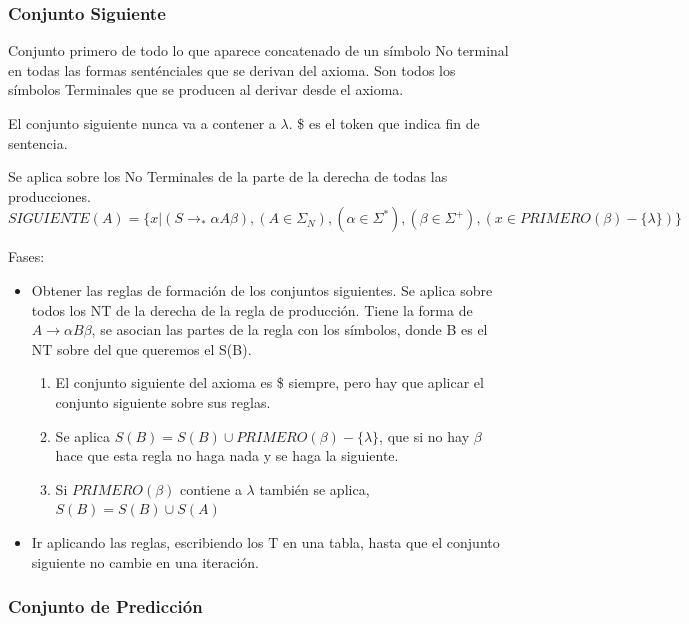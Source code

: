 \documentclass[12pt]{report} %
\begin{document}
\subsubsection{Conjunto Siguiente}

Conjunto primero de todo lo que aparece concatenado de un símbolo No
terminal en todas las formas senténciales que se derivan del axioma. Son
todos los símbolos Terminales que se producen al derivar desde el
axioma.

El conjunto siguiente nunca va a contener a \(\lambda\). \$ es el token
que indica fin de sentencia.

Se aplica sobre los No Terminales de la parte de la derecha de todas las
producciones. \[
SIGUIENTE(A)=\{ x | (S \rightarrow _*\alpha A \beta), (A \in \Sigma_N), (\alpha \in \Sigma^*), (\beta \in \Sigma^+),(x\in PRIMERO(\beta)-\{\lambda\})\}
\]

Fases:

\begin{itemize}

\item
  Obtener las reglas de formación de los conjuntos siguientes. Se aplica
  sobre todos los NT de la derecha de la regla de producción. Tiene la
  forma de \(A \rightarrow \alpha B \beta\), se asocian las partes de la
  regla con los símbolos, donde B es el NT sobre del que queremos el
  S(B).

\begin{enumerate}
\def\labelenumi{\arabic{enumi}.}
\item
  El conjunto siguiente del axioma es \$ siempre, pero hay que aplicar
  el conjunto siguiente sobre sus reglas.
\item
  Se aplica \(S(B)=S(B)\cup PRIMERO(\beta)-\{\lambda\}\), que si no hay
  \(\beta\) hace que esta regla no haga nada y se haga la siguiente.
\item
  Si \(PRIMERO(\beta)\) contiene a \(\lambda\) también se aplica,
  \(S(B)=S(B)\cup S(A)\)
\end{enumerate}


\item
  Ir aplicando las reglas, escribiendo los T en una tabla, hasta que el
  conjunto siguiente no cambie en una iteración.
\end{itemize}

\subsubsection{Conjunto de Predicción}
\end{document}
